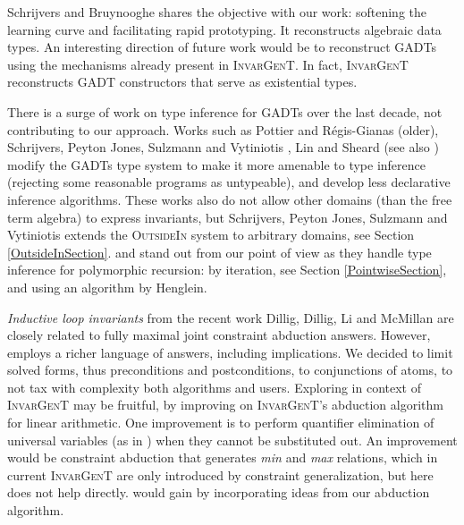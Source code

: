 \documentclass{article}
\newcommand{\tmem}[1]{{\em #1\/}}
\newcommand{\tmname}[1]{\textsc{#1}}
\begin{document}
Schrijvers and Bruynooghe {\cite{ADTReconstruct}} shares the objective with
our work: softening the learning curve and facilitating rapid prototyping. It
reconstructs algebraic data types. An interesting direction of future work
would be to reconstruct GADTs using the mechanisms already present in
{\tmname{InvarGenT}}. In fact, {\tmname{InvarGenT}} reconstructs GADT
constructors that serve as existential types.

There is a surge of work on type inference for GADTs over the last decade, not
contributing to our approach. Works such as Pottier and R{\'e}gis-Gianas
{\cite{StratifiedGADTs}} (older), Schrijvers, Peyton Jones, Sulzmann and
Vytiniotis {\cite{ComplDecidableGADTs}}, Lin and Sheard
{\cite{PointwiseGADTs}} (see also {\cite{PracticalGADTsInfer}}) modify the
GADTs type system to make it more amenable to type inference (rejecting some
reasonable programs as untypeable), and develop less declarative inference
algorithms. These works also do not allow other domains (than the free term
algebra) to express invariants, but Schrijvers, Peyton Jones, Sulzmann  and 
Vytiniotis {\cite{OutsideIn}} extends the {\tmname{OutsideIn}} system to
arbitrary domains, see Section \ref{OutsideInSection}.
{\cite{PracticalGADTsInfer}} and {\cite{ADTReconstruct}} stand out from our
point of view as they handle type inference for polymorphic recursion:
{\cite{PracticalGADTsInfer}} by iteration, see Section \ref{PointwiseSection},
and {\cite{ADTReconstruct}} using an algorithm by Henglein.

{\tmem{Inductive loop invariants}} from the recent work Dillig, Dillig, Li and
McMillan {\cite{InductLoopInv}} are closely related to fully maximal joint
constraint abduction answers. However, {\cite{InductLoopInv}} employs a richer
language of answers, including implications. We decided to limit solved forms,
thus preconditions and postconditions, to conjunctions of atoms, to not tax
with complexity both algorithms and users. Exploring {\cite{InductLoopInv}} in
context of {\tmname{InvarGenT}} may be fruitful, by improving on
{\tmname{InvarGenT}}'s abduction algorithm for linear arithmetic. One
improvement is to perform quantifier elimination of universal variables (as in
{\cite{InductLoopInv}}) when they cannot be substituted out. An improvement
would be constraint abduction that generates {\tmem{min}} and {\tmem{max}}
relations, which in current {\tmname{InvarGenT}} are only introduced by
constraint generalization, but here {\cite{InductLoopInv}} does not help
directly. {\cite{InductLoopInv}} would gain by incorporating ideas from our
abduction algorithm.
\end{document}

